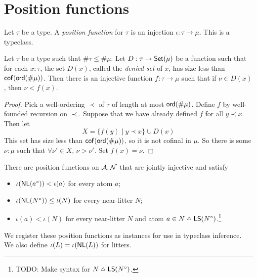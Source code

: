 \section{Position functions}
\begin{definition}
  \label{def:Position}
  Let \( \tau \) be a type.
  A \emph{position function} for \( \tau \) is an injection \( \iota : \tau \to \mu \).
  This is a typeclass.
\end{definition}
\begin{proposition}
  \label{prop:funOfDeny}
  Let \( \tau \) be a type such that \( \#\tau \leq \#\mu \).
  Let \( D : \tau \to \operatorname{\mathsf{Set}}(\mu) \) be a function such that for each \( x : \tau \), the set \( D(x) \), called the \emph{denied set} of \( x \), has size less than \( \operatorname{\mathsf{cof}}(\operatorname{\mathsf{ord}}(\#\mu)) \).
  Then there is an injective function \( f : \tau \to \mu \) such that if \( \nu \in D(x) \), then \( \nu < f(x) \).
\end{proposition}
\begin{proof}
  Pick a well-ordering \( \prec \) of \( \tau \) of length at most \( \operatorname{\mathsf{ord}}(\#\mu) \).
  Define \( f \) by well-founded recursion on \( \prec \).
  Suppose that we have already defined \( f \) for all \( y \prec x \).
  Then let
  \[ X = \{ f(y) \mid y \prec x \} \cup D(x) \]
  This set has size less than \( \operatorname{\mathsf{cof}}(\operatorname{\mathsf{ord}}(\#\mu)) \), so it is not cofinal in \( \mu \).
  So there is some \( \nu : \mu \) such that \( \forall \nu' \in X,\, \nu > \nu' \).
  Set \( f(x) = \nu \).
\end{proof}
\begin{proposition}
  \label{prop:BasePositions}
  There are position functions on \( {\mathcal A}, {\mathcal N} \) that are jointly injective and satisfy
  \begin{itemize}
    \item \( \iota(\operatorname{\mathsf{NL}}(a^\circ)) < \iota(a) \) for every atom \( a \);
    \item \( \iota(\operatorname{\mathsf{NL}}(N^\circ)) \leq \iota(N) \) for every near-litter \( N \);
    \item \( \iota(a) < \iota(N) \) for every near-litter \( N \) and atom \( a \in N \symmdiff \LS(N^\circ) \).\footnote{TODO: Make syntax for \( N \symmdiff \LS(N^\circ) \).}
  \end{itemize}
  We register these position functions as instances for use in typeclass inference.
  We also define \( \iota(L) = \iota(\operatorname{\mathsf{NL}}(L)) \) for litters.
\end{proposition}
